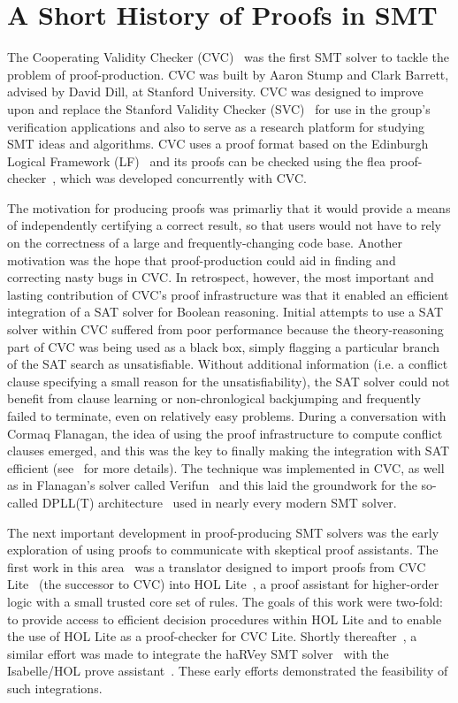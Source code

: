 \documentclass{llncs}
\begin{document}
\section{A Short History of Proofs in SMT}
\label{sec:history}
The Cooperating Validity Checker (CVC)~\cite{SBD02} was the first SMT solver to
tackle the problem of proof-production.  CVC was built by Aaron Stump and Clark
Barrett, advised by David Dill, at Stanford University.  CVC was designed to
improve upon and replace the Stanford Validity Checker (SVC)~\cite{BDL96} for
use in the group's verification applications and also to serve as a research
platform for studying SMT ideas and algorithms.    CVC
uses a proof format based on the Edinburgh Logical Framework (LF)~\cite{HHP93}
and its proofs can be checked using the flea proof-checker~\cite{SBD02b,SD02}, which was
developed concurrently with CVC.

The motivation for producing proofs was primarliy that it would provide a means
of independently certifying a correct result,
so that users would not have to rely on the correctness of a large and
frequently-changing code base.  Another motivation was the hope that
proof-production could aid in finding and correcting nasty bugs in CVC.
In retrospect, however, the most important and lasting contribution of CVC's
proof infrastructure was that it enabled an efficient integration of a SAT
solver for Boolean reasoning.  Initial attempts to use a SAT solver within
CVC suffered from poor performance because the theory-reasoning part of CVC
was being used as a black box, simply flagging a particular branch of the SAT
search as unsatisfiable.  Without additional information (i.e. a conflict
clause specifying a small reason for the unsatisfiability), the SAT solver could
not benefit from clause learning or non-chronlogical backjumping and frequently
failed to terminate, even on relatively easy problems.  During a conversation
with Cormaq Flanagan, the idea of using the proof infrastructure to compute
conflict clauses emerged, and this was the key to finally making the
integration with SAT efficient (see~\cite{BDS02-CAV02} for more details).  The
technique was implemented in CVC, as well as in Flanagan's solver called
Verifun~\cite{FJO+03} and this laid the groundwork for the so-called DPLL(T)
architecture~\cite{NieOT-JACM-06} used in nearly every modern SMT solver.

The next important development in proof-producing SMT solvers was the
early exploration of using proofs to communicate with skeptical proof
assistants.  The first work in this area~\cite{MBG06} was a translator designed
to import proofs from CVC Lite~\cite{BB04} (the successor to CVC) into HOL
Lite~\cite{H96}, a proof assistant for higher-order logic with a small trusted
core set of rules.  The goals of this work were two-fold: to provide access to
efficient decision procedures within HOL Lite and to enable the use of HOL Lite
as a proof-checker for CVC Lite.  Shortly thereafter~\cite{FMM+06,HCF+07}, a similar effort was
made to integrate the haRVey SMT solver~\cite{DR03} with the Isabelle/HOL prove
assistant~\cite{NPW02}. These early efforts demonstrated the feasibility of such
integrations.
\end{document}
